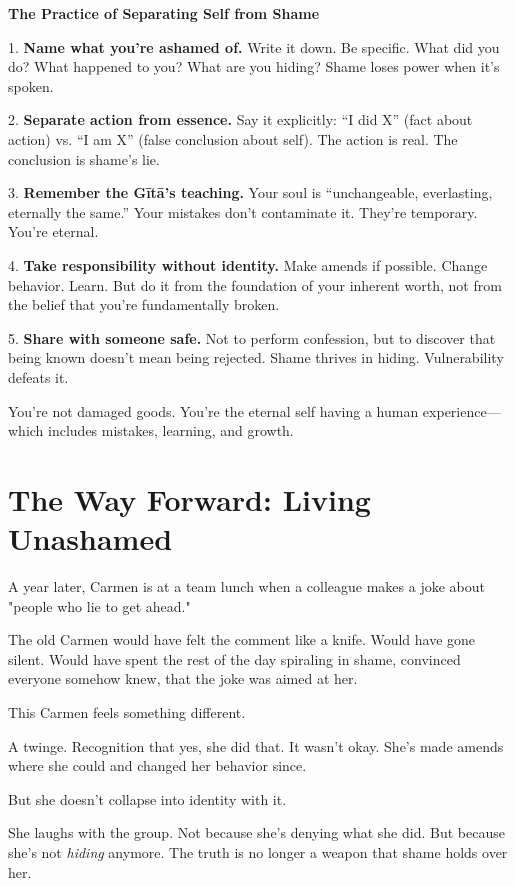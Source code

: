 \documentclass[11pt,twoside]{book}
\begin{document}
\begin{practicebox}
\textbf{The Practice of Separating Self from Shame}

1. \textbf{Name what you're ashamed of.} Write it down. Be specific. What did you do? What happened to you? What are you hiding? Shame loses power when it's spoken.

2. \textbf{Separate action from essence.} Say it explicitly: ``I did X'' (fact about action) vs. ``I am X'' (false conclusion about self). The action is real. The conclusion is shame's lie.

3. \textbf{Remember the Gītā's teaching.} Your soul is ``unchangeable, everlasting, eternally the same.'' Your mistakes don't contaminate it. They're temporary. You're eternal.

4. \textbf{Take responsibility without identity.} Make amends if possible. Change behavior. Learn. But do it from the foundation of your inherent worth, not from the belief that you're fundamentally broken.

5. \textbf{Share with someone safe.} Not to perform confession, but to discover that being known doesn't mean being rejected. Shame thrives in hiding. Vulnerability defeats it.

You're not damaged goods. You're the eternal self having a human experience—which includes mistakes, learning, and growth.
\end{practicebox}

\section*{The Way Forward: Living Unashamed}

A year later, Carmen is at a team lunch when a colleague makes a joke about "people who lie to get ahead."

The old Carmen would have felt the comment like a knife. Would have gone silent. Would have spent the rest of the day spiraling in shame, convinced everyone somehow knew, that the joke was aimed at her.

This Carmen feels something different.

A twinge. Recognition that yes, she did that. It wasn't okay. She's made amends where she could and changed her behavior since.

But she doesn't collapse into identity with it.

She laughs with the group. Not because she's denying what she did. But because she's not \emph{hiding} anymore. The truth is no longer a weapon that shame holds over her.
\end{document}

